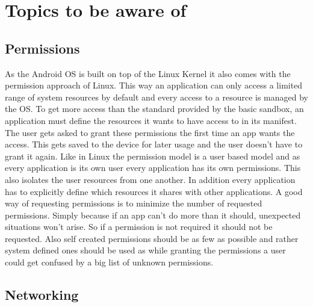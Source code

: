 \chapter{Topics to be aware of}
\label{chp:howto}

\section{Permissions}
\label{chp:howto:sec:permissions}

As the Android OS is built on top of the Linux Kernel it also comes with the permission approach of Linux. This way an application can only access a limited range of system resources by default and every access to a resource is managed by the OS.
To get more access than the standard provided by the basic sandbox, an application must define the resources it wants to have access to in its manifest. The user gets asked to grant these permissions the first time an app wants the access. This gets saved to the device for later usage and the user doesn't have to grant it again.
Like in Linux the permission model is a user based model and as every application is its own user every application has its own permissions. This also isolates the user resources from one another. In addition every application has to explicitly define which resources it shares with other applications.
A good way of requesting permissions is to minimize the number of requested permissions. Simply because if an app can't do more than it should, unexpected situations won't arise. So if a permission is not required it should not be requested.
Also self created permissions should be as few as possible and rather system defined ones should be used as while granting the permissions a user could get confused by a big list of unknown permissions.

\section{Networking}
\label{chp:howto:sec:networking}

